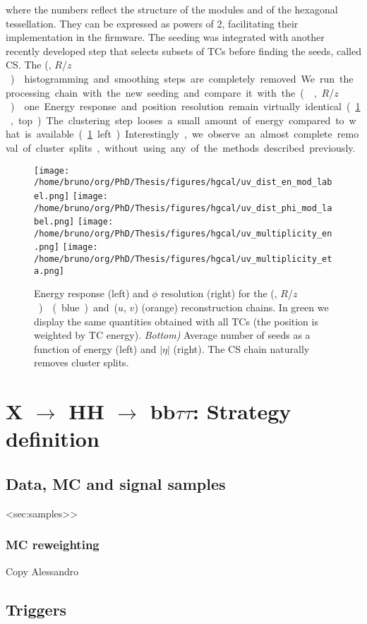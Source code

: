 \documentclass[11pt]{article}
\newcommand{\reshhbbtt}{X $\rightarrow$ HH $\rightarrow$ bb$\tau\tau$}
\newcommand{\coordsa}{(\si{\azi}, \si{\rz})}
\newcommand{\coordsb}{($u$, $v$)}
\newcommand{\rz}{$R$/$z$}
\begin{document}
\noindent where the numbers reflect the structure of the modules and of the hexagonal tessellation.
They can be expressed as powers of 2, facilitating their implementation in the firmware.
The seeding was integrated with another recently developed step that selects subsets of \acp{TC} before finding the seeds, called \ac{CS}.
The \coordsa{} histogramming and smoothing steps are completely removed.
We run the processing chain with the new seeding and compare it with the \coordsa{} one.
Energy response and position resolution remain virtually identical (\cref{fig:uv_dist}, top).
The clustering step looses a small amount of energy compared to what is available (\cref{fig:uv_dist} left).
Interestingly, we observe an almost complete removal of cluster splits, without using any of the methods described previously.

\begin{figure}
\texttt{[image: /home/bruno/org/PhD/Thesis/figures/hgcal/uv\_dist\_en\_mod\_label.png]}
\texttt{[image: /home/bruno/org/PhD/Thesis/figures/hgcal/uv\_dist\_phi\_mod\_label.png]}
\texttt{[image: /home/bruno/org/PhD/Thesis/figures/hgcal/uv\_multiplicity\_en.png]}
\texttt{[image: /home/bruno/org/PhD/Thesis/figures/hgcal/uv\_multiplicity\_eta.png]}
\caption{\label{fig:uv_dist}Energy response (left) and \(\phi\) resolution (right) for the \coordsa{} (blue) and \coordsb{} (orange) reconstruction chains. In green we display the same quantities obtained with all \acp{TC} (the position is weighted by \ac{TC} energy). \emph{Bottom)} Average number of seeds as a function of energy (left) and \(|\eta|\) (right). The CS chain naturally removes cluster splits.}
\end{figure}
\section{\reshhbbtt{}: Strategy definition}
\label{sec:org151af64}
\label{sec::bbtautau}
\subsection{Data, MC and signal samples}
\label{sec:org2bdbb92}
<sec:samples>>
\subsubsection{MC reweighting}
\label{sec:org5ec82cf}
Copy Alessandro
\subsection{Triggers}
\label{sec:org86af208}
\end{document}
